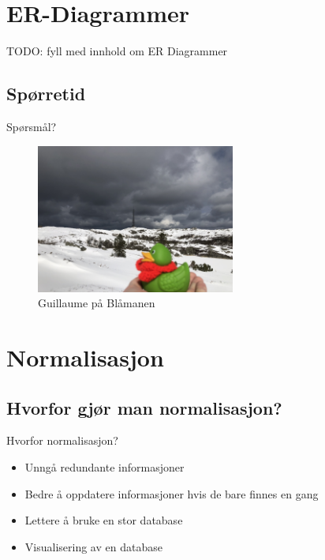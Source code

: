 
\section{ER-Diagrammer}
\begin{frame}{}
    TODO: fyll med innhold om ER Diagrammer
\end{frame}

\subsection*{Spørretid}
\begin{frame}{Spørsmål?}
    \begin{figure}
        \centering
        \includegraphics[height = 4.9cm]{images/guillaume6.jpg}
        \caption{Guillaume på Blåmanen}
        \label{fig:guillaume6}
    \end{figure}
\end{frame}


\section{Normalisasjon}
\subsection*{Hvorfor gjør man normalisasjon?}
\begin{frame}{Hvorfor normalisasjon?}
\begin{itemize}
    \item Unngå redundante informasjoner
    \item Bedre å oppdatere informasjoner hvis de bare finnes en gang
    \item Lettere å bruke en stor database
    \item Visualisering av en database
\end{itemize}
\end{frame}

